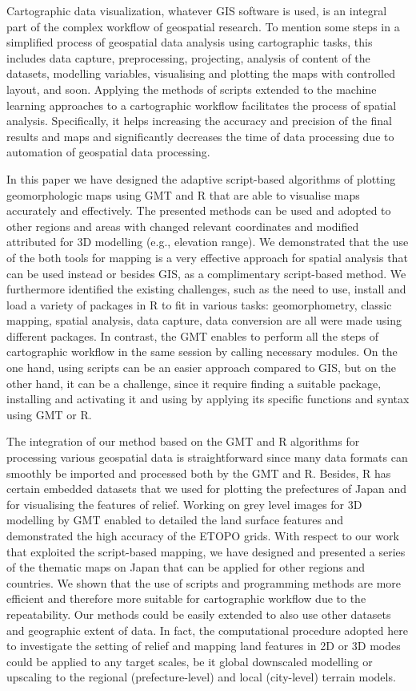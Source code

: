 \documentclass[land,article,submit,pdftex,moreauthors]{Definitions/mdpi}
\begin{document}
Cartographic data visualization, whatever GIS software is used, is an integral part of the complex workflow of geospatial research. To mention some steps in a simplified process of geospatial data analysis using cartographic tasks, this includes data capture, preprocessing, projecting, analysis of content of the datasets, modelling variables, visualising and plotting the maps with controlled layout, and soon. Applying the methods of scripts extended to the machine learning approaches to a cartographic workflow facilitates the process of spatial analysis. Specifically, it helps increasing the accuracy and precision of the final results and maps and significantly decreases the time of data processing due to automation of geospatial data processing. 

In this paper we have designed the adaptive script-based algorithms of plotting geomorphologic maps using GMT and R that are able to visualise maps accurately and effectively. The presented methods can be used and adopted to other regions and areas with changed relevant coordinates and modified attributed for 3D modelling (e.g., elevation range). We demonstrated that the use of the both tools for mapping is a very effective approach for spatial analysis that can be used instead or besides GIS, as a complimentary script-based method. We furthermore identified the existing challenges, such as the need to use, install and load a variety of packages in R to fit in various tasks: geomorphometry, classic mapping, spatial analysis, data capture, data conversion are all were made using different packages. In contrast, the GMT enables to perform all the steps of cartographic workflow in the same session by calling necessary modules. On the one hand, using scripts can be an easier approach  compared to GIS, but on the other hand, it can be a challenge, since it require finding a suitable package, installing and activating it and using by applying its specific functions and syntax using GMT or R. 

The integration of our method based on the GMT and R algorithms for processing various geospatial data is straightforward since many data formats can smoothly be imported and processed both by the GMT and R. Besides, R has certain embedded datasets that we used for plotting the prefectures of Japan and for visualising the features of relief. Working on grey level images for 3D modelling by GMT enabled to detailed the land surface features and demonstrated the high accuracy of the ETOPO grids. With respect to our work that exploited the script-based mapping, we have designed and presented a series of the thematic maps on Japan that can be applied for other regions and countries. We shown that the use of scripts and programming methods are more efficient and therefore more suitable for cartographic workflow due to the repeatability. Our methods could be easily extended to also use other datasets and geographic extent of data. In fact, the computational procedure adopted here to investigate the setting of relief and mapping land features in 2D or 3D modes could be applied to any target scales, be it global downscaled modelling or upscaling to the regional (prefecture-level) and local (city-level)  terrain models. 
\end{document}
